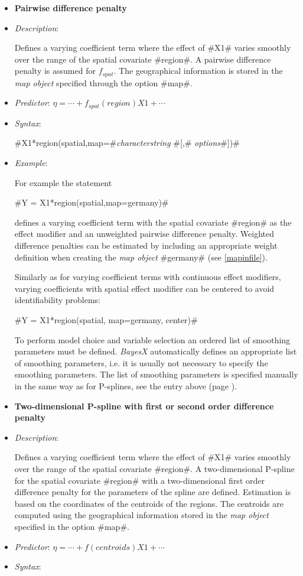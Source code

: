 \begin{itemize}
\item[]{\bf\sffamily Pairwise difference penalty}

\item[] {\em Description}:

Defines a varying coefficient term where the effect of #X1# varies
smoothly over the range of the spatial covariate #region#. A
pairwise difference penalty is assumed for $f_{spat}$. The geographical
information is stored in the {\em map object} specified through the
option #map#.
\item[] {\em Predictor}: $\eta = \cdots + f_{spat}(region)X1 + \cdots$
\item[] {\em Syntax}:

#X1*region(spatial,map=#{\it characterstring} #[,# {\it options}#])#
\item[] {\em Example}:

For example the statement

#Y = X1*region(spatial,map=germany)#

defines a varying coefficient term with the spatial covariate
#region# as the effect modifier and an unweighted pairwise difference penalty.
Weighted difference penalties  can be estimated by
including an appropriate weight definition when creating the {\em
map object} #germany# (see \autoref{mapinfile}).

Similarly as for varying coefficient terms with continuous effect
modifiers, varying coefficients with spatial effect modifier can be
centered to avoid identifiability problems:

#Y = X1*region(spatial, map=germany, center)#


To perform model choice and variable selection an ordered list of smoothing parameters must be defined. {\em BayesX} automatically defines an appropriate list of smoothing
parameters, i.e. it is usually not necessary to  specify the smoothing parameters. The list of smoothing parameters is
specified manually in the same way as for P-splines, see the entry above (page \pageref{psplines_stepwise}).

\clearpage

\item[]{\bf\sffamily Two-dimensional P-spline with first or second order difference penalty}

\item[] {\em Description}:

Defines a varying coefficient term where the effect of #X1# varies
smoothly over the range of the spatial covariate #region#.
A two-dimensional P-spline for the spatial covariate
#region# with a two-dimensional first order difference penalty
for the parameters of the spline are defined. Estimation is based on the
coordinates of the centroids of the regions. The centroids are
computed using the geographical information stored in the {\em map
object} specified in the option #map#.
\item[] {\em Predictor}:
$\eta= \cdots + f(centroids) X1 + \cdots$ \item[] {\em Syntax}:


\end{itemize}
